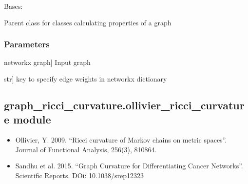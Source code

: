 \documentclass[letterpaper,10pt,english]{sphinxmanual}
\begin{document}
\begin{fulllineitems}
\label{\detokenize{graph_ricci_curvature:graph_ricci_curvature.graph_metric.GraphMetric}}
\pysigstartsignatures
{}
\pysigstopsignatures
\sphinxAtStartPar
Bases: 

\sphinxAtStartPar
Parent class for classes calculating properties of a graph


\subsubsection{Parameters}
\label{\detokenize{graph_ricci_curvature:parameters}}\begin{description}
\sphinxlineitem{G}{[}networkx graph{]}
\sphinxAtStartPar
Input graph

\sphinxlineitem{weight\_key}{[}str{]}
\sphinxAtStartPar
key to specify edge weights in networkx dictionary

\end{description}

\end{fulllineitems}



\subsection{graph\_ricci\_curvature.ollivier\_ricci\_curvature module}
\label{\detokenize{graph_ricci_curvature:module-graph_ricci_curvature.ollivier_ricci_curvature}}\label{\detokenize{graph_ricci_curvature:graph-ricci-curvature-ollivier-ricci-curvature-module}}\begin{description}
\begin{itemize}
\item {} 
\sphinxAtStartPar
Ollivier, Y. 2009. “Ricci curvature of Markov chains on metric spaces”. Journal of Functional Analysis, 256(3), 810\sphinxhyphen{}864.

\item {} 
\sphinxAtStartPar
Sandhu et al. 2015. “Graph Curvature for Differentiating Cancer Networks”. Scientific Reports. DOi: 10.1038/srep12323

\end{itemize}

\end{description}
\end{document}
